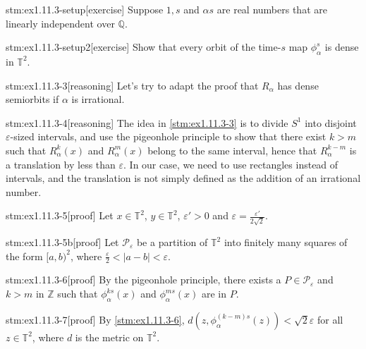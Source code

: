
\begin{stm}{stm:ex1.11.3-setup}[exercise]
Suppose $1, s$ and $\alpha s$ are real numbers that are linearly independent over $\mathbb{Q}$.
\end{stm}

\begin{stm}{stm:ex1.11.3-setup2}[exercise]
Show that every orbit of the time-$s$ map $\phi_\alpha^s$ is dense in $\mathbb{T}^2$.
\end{stm}


\begin{stm}{stm:ex1.11.3-3}[reasoning]
Let's try to adapt the proof that $R_\alpha$ has dense semiorbits if $\alpha$ is irrational.
\end{stm}

\begin{stm}{stm:ex1.11.3-4}[reasoning]
The idea in \ref{stm:ex1.11.3-3} is to divide $S^1$ into disjoint $\varepsilon$-sized intervals, and use the pigeonhole principle to show that there exist $k > m$ such that $R_\alpha^k(x)$ and $R_\alpha^m(x)$ belong to the same interval, hence that $R_\alpha^{k-m}$ is a translation by less than $\varepsilon$. In our case, we need to use rectangles instead of intervals, and the translation is not simply defined as the addition of an irrational number.
\end{stm}

\begin{stm}{stm:ex1.11.3-5}[proof]
Let $x \in \mathbb{T}^2$, $y \in \mathbb{T}^2$, $\varepsilon' > 0$ and $\varepsilon = \frac{\varepsilon'}{2\sqrt{2}}$. 
\end{stm}

\begin{stm}{stm:ex1.11.3-5b}[proof]
Let $\mathcal{P}_\varepsilon$ be a partition of $\mathbb{T}^2$ into finitely many squares of the form $[a,b)^2$, where $\frac{\varepsilon}{2} < |a-b| < \varepsilon$.
\end{stm}

\begin{stm}{stm:ex1.11.3-6}[proof]
By the pigeonhole principle, there exists a $P \in \mathcal{P}_\varepsilon$ and $k > m$ in $\mathbb{Z}$ such that $\phi_\alpha^{ks}(x)$ and $\phi_\alpha^{ms}(x)$ are in $P$.
\end{stm}

\begin{stm}{stm:ex1.11.3-7}[proof]
By \ref{stm:ex1.11.3-6}, $d(z, \phi_\alpha^{(k-m)s}(z)) < \sqrt{2} \varepsilon$ for all $z \in \mathbb{T}^2$, where $d$ is the metric on $\mathbb{T}^2$.
\end{stm}


